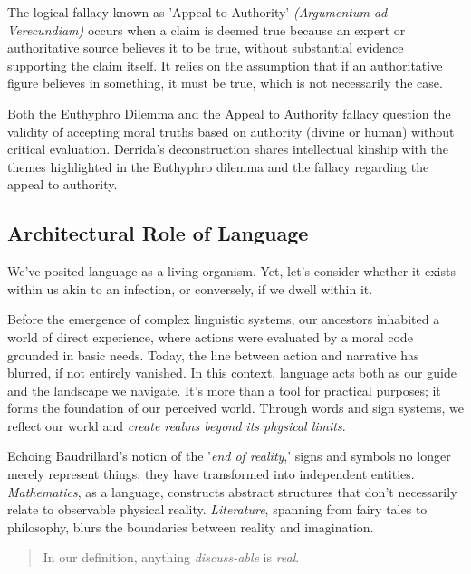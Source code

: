 \documentclass[11pt,a4]{article}
\begin{document}
    \par


    The  logical fallacy known as 'Appeal to Authority' \textit{(Argumentum ad Verecundiam)} occurs when a claim is deemed true because an expert or authoritative source believes it to be true, without substantial evidence supporting the claim itself.  It relies on the assumption that if an authoritative figure believes in something, it must be true, which is not necessarily the case.

    \par

    Both the Euthyphro Dilemma and the Appeal to Authority fallacy question the validity of accepting moral truths based on authority (divine or human) without critical evaluation. Derrida's deconstruction\cite{Deconstruction} shares intellectual kinship with the themes highlighted in the Euthyphro dilemma and the fallacy regarding the appeal to authority.


\subsection{Architectural Role of Language}
        We've posited language as a living organism. Yet, let's consider whether it exists within us akin to an infection, or conversely, if we dwell within it.
        \par
        Before the emergence of complex linguistic systems, our ancestors inhabited a world of direct experience, where actions were evaluated by a moral code grounded in basic needs. Today, the line between action and narrative has blurred, if not entirely vanished. In this context, language acts both as our guide and the landscape we navigate. It's more than a tool for practical purposes; it forms the foundation of our perceived world. Through words and sign systems, we reflect our world and \textit{create realms beyond its physical limits}.

        \par
        Echoing Baudrillard's notion of the '\textit{end of reality},' signs and symbols no longer merely represent things; they have transformed into independent entities.
        \textit{Mathematics}, as a language, constructs abstract structures that don't necessarily relate to observable physical reality. \textit{Literature}, spanning from fairy
        tales to philosophy, blurs the boundaries between reality and imagination.

        \par
        \begin{quote}
            In our definition, anything \textit{discuss-able} is \textit{real}.
        \end{quote}
\end{document}

